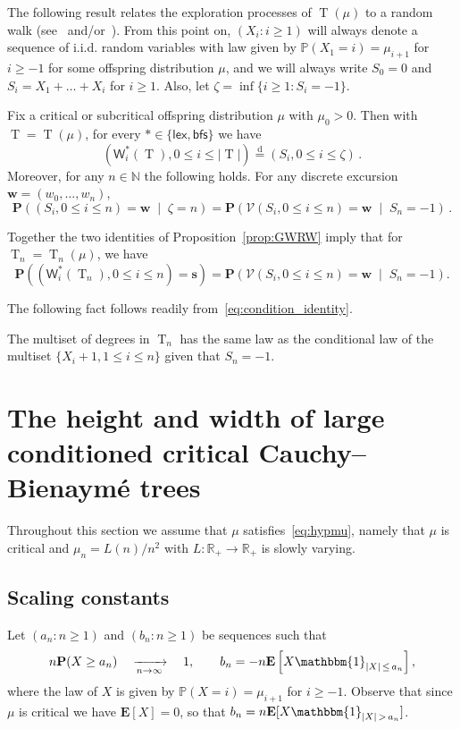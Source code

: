 \documentclass[AHL,Unicode,longabstracts,published]{cedram}
\newcommand{\R}{\mathbb{R}}
\newcommand{\N}{\mathbb{N}}
\renewcommand{\P}{\mathbb{P}}
\newcommand*\W{\mathsf{W}}
\newcommand{\bfs}{\mathsf{bfs}}
\newcommand{\p}{\mathbf{P}}
\newcommand{\bfw}{\mathbf{w}}
\newcommand{\bffs}{\mathbf{s}}
\newcommand{\lex}{\mathsf{lex}}
\newcommand{\E}[1]{{\mathbf E}\left[#1\right]}
\newcommand{\bfE}{\mathbf{E}}
\DeclareMathOperator{\rtree}{T}
\newcommand{\cV}{\mathcal{V}}
\newcommand{\set}[1]{\left(#1 \right)}
\newcommand{\Cprob}[2]{\mathbf{P}\set{\left. #1 \; \middle| \; #2\right.}}
\newcommand{\eqdist}{\ensuremath{\stackrel{\mathrm{d}}{=}}}
\begin{document}
The following result relates the exploration processes of $\rtree(\mu)$ to a random walk (see~\cite[Proposition~1.5]{LG05} and/or~\cite[Chapter~5 Exercise~1]{MR2245368}). From this point on, $(X_{i} : i \geq 1)$ will always denote a sequence of i.i.d. random variables with law given by $\P(X_{1}=i)=\mu_{i+1}$ for $i \geq -1$ for some offspring distribution $\mu$, and we will always write $S_0=0$ and $S_i=X_1+\ldots+X_i$ for $i \ge 1$. Also, let $\zeta=\inf\{i \ge 1: S_i = -1\}$.
\begin{prop}\label{prop:GWRW}
Fix a critical or subcritical offspring distribution $\mu$ with $\mu_0>0$. Then with $\rtree=\rtree(\mu)$, for every $\ast \in \{\lex,\bfs\}$ we have
\[
\left(\W^{\ast}_{i}(\rtree),0 \le i \le |\rtree|\right)\eqdist (S_i,0 \le i \le \zeta)\,.
\]
Moreover, for any $n \in \N$ the following holds. For any discrete excursion $\bfw=(w_0,\ldots,w_n)$,
\[
\Cprob{(S_i,0 \le i \le n)=\bfw}{\zeta=n} =\Cprob{\cV(S_i,0 \le i \le n)=\bfw}{S_n=-1}\,.
\]
\end{prop}

Together the two identities of Proposition~\ref{prop:GWRW} imply that for $\rtree_n=\rtree_n(\mu)$, we have
\begin{equation}\label{eq:condition_identity}
\p\left((\W^{\ast}_{i}(\rtree_n),0 \le i \le n)=\bffs\right) =
\Cprob{\cV(S_i,0 \le i \le n)=\bfw}{S_n=-1}.
\end{equation}

The following fact follows readily from~\eqref{eq:condition_identity}.
\begin{rema}\label{rk:degrees}
The multiset of degrees in $\rtree_n$ has the same law as the conditional law of the multiset $\{X_i+1,1 \le i \le n\}$ given that $S_n=-1$.
\end{rema}



\section{The height and width of large conditioned critical Cauchy--Bienaymé trees}\label{sec:cauchy_trees}

Throughout this section we assume that $\mu$ satisfies~\eqref{eq:hypmu}, namely that $\mu$ is critical and $\mu_n=L(n)/n^{2}$ with $L : \R_{+} \rightarrow \R_{+}$ is slowly varying.

\subsection{Scaling constants}\label{sec:scalingconstants}
Let $(a_{n} : n \geq 1)$ and $(b_{n} : n \geq 1)$ be sequences such that
\begin{equation}\label{eq:defanbn}
n \p(X \geq a_{n}) \quad \xrightarrow[n\to\infty]{} \quad 1, \qquad b_{n}=-n \E{X \mathbbm{1}_{|X|\, \leq \,a_{n}}},
\end{equation}
where the law of $X$ is given by $\P(X=i)=\mu_{i+1}$ for $i \geq -1$. Observe that since $\mu$ is critical we have $\E{X}=0$, so that $b_{n}=n \bfE[X \mathbbm{1}_{|X|\,>\,a_{n}}]$.
\end{document}
